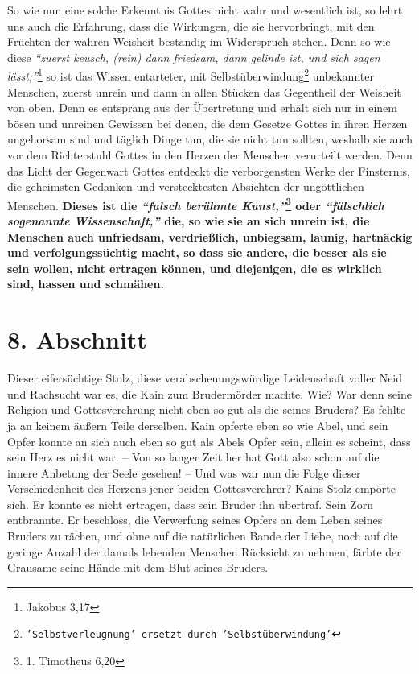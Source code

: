 So wie nun eine solche Erkenntnis Gottes nicht wahr und wesentlich ist, so
lehrt uns auch die Erfahrung, dass die Wirkungen, die sie hervorbringt, mit den
Früchten der wahren Weisheit beständig im Widerspruch stehen. Denn so wie diese
\textit{"`zuerst keusch, (rein) dann friedsam, dann gelinde ist, und sich sagen
lässt;"'}\footnote{Jakobus 3,17}
so ist das Wissen entarteter, mit
Selbstüberwindung\footnote{\texttt{'Selbstverleugnung' ersetzt durch
'Selbstüberwindung'}}
unbekannter Menschen, zuerst unrein und dann in allen Stücken das Gegentheil
der Weisheit von oben. Denn es entsprang aus der Übertretung und erhält sich
nur in einem bösen und unreinen Gewissen bei denen, die
dem Gesetze Gottes in
ihren Herzen ungehorsam sind und täglich Dinge tun, die sie nicht tun
sollten, weshalb sie auch vor dem Richterstuhl Gottes in den Herzen der
Menschen verurteilt werden. Denn das Licht der Gegenwart Gottes entdeckt die
verborgensten Werke der Finsternis, die geheimsten
Gedanken  und verstecktesten
Absichten der ungöttlichen
Menschen. \textbf{Dieses ist die
\textit{"`falsch berühmte Kunst,"'}\footnote{1. Timotheus 6,20}
 \label{ref:07_07_aroganz}
oder \textit{"`fälschlich sogenannte
Wissenschaft,"'}
die, so wie sie an sich unrein  ist, die
Menschen auch unfriedsam, verdrießlich,
unbiegsam, launig, hartnäckig und verfolgungssüchtig macht, so dass sie andere,
die besser als sie sein wollen, nicht ertragen können, und diejenigen, die es
wirklich sind, hassen und schmähen.}

\section{8. Abschnitt} \label{kap7_ab8}

Dieser eifersüchtige Stolz, diese
verabscheuungswürdige Leidenschaft voller Neid
und Rachsucht war es, die Kain  zum
Brudermörder  machte. Wie? War denn seine
Religion und Gottesverehrung nicht eben so gut als die seines Bruders? Es fehlte
ja an keinem äußern Teile derselben. Kain  opferte eben so wie
Abel, und sein
Opfer konnte an sich auch eben so gut als Abels Opfer sein, allein es scheint,
dass sein Herz es nicht war. -- Von so langer Zeit her hat Gott also schon auf
die innere Anbetung der Seele gesehen! -- Und was war nun die Folge dieser
Verschiedenheit des Herzens jener beiden Gottesverehrer? Kains Stolz empörte
sich. Er konnte es nicht ertragen, dass sein Bruder ihn übertraf. Sein Zorn
entbrannte. Er beschloss, die Verwerfung seines Opfers an dem Leben seines
Bruders zu rächen, und ohne auf die natürlichen Bande der Liebe,
noch auf die
geringe Anzahl der damals lebenden Menschen Rücksicht zu nehmen, färbte der
Grausame seine Hände mit dem Blut seines Bruders.


